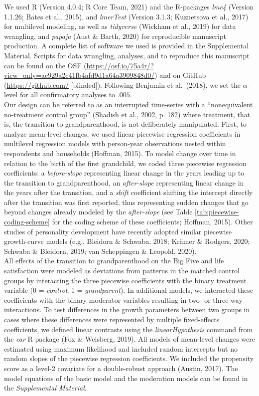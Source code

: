 \documentclass[
  english,
  man, noextraspace]{apa7}
\begin{document}
We used R (Version 4.0.4; R Core Team, 2021) and the R-packages \emph{lme4} (Version 1.1.26; Bates et al., 2015), and \emph{lmerTest} (Version 3.1.3; Kuznetsova et al., 2017) for multilevel modeling, as well as \emph{tidyverse} (Wickham et al., 2019) for data wrangling, and \emph{papaja} (Aust \& Barth, 2020) for reproducible manuscript production. A complete list of software we used is provided in the Supplemental Material. Scripts for data wrangling, analyses, and to reproduce this manuscript can be found on the OSF (\url{https://osf.io/75a4r/?view_only=ac929a2c41fb4afd9d1a64a3909848d0/}) and on GitHub (\url{https://github.com/} {[}blinded{]}). Following Benjamin et al.~(2018), we set the \(\alpha\)-level for all confirmatory analyses to \(.005\).\\
Our design can be referred to as an interrupted time-series with a \enquote{nonequivalent no-treatment control group} (Shadish et al., 2002, p. 182) where treatment, that is, the transition to grandparenthood, is not deliberately manipulated. First, to analyze mean-level changes, we used linear piecewise regression coefficients in multilevel regression models with person-year observations nested within respondents and households (Hoffman, 2015). To model change over time in relation to the birth of the first grandchild, we coded three piecewise regression coefficients: a \emph{before-slope} representing linear change in the years leading up to the transition to grandparenthood, an \emph{after-slope} representing linear change in the years after the transition, and a \emph{shift} coefficient shifting the intercept directly after the transition was first reported, thus representing sudden changes that go beyond changes already modeled by the \emph{after-slope} (see Table \ref{tab:piecewise-coding-scheme} for the coding scheme of these coefficients; Hoffman, 2015). Other studies of personality development have recently adopted similar piecewise growth-curve models (e.g., Bleidorn \& Schwaba, 2018; Krämer \& Rodgers, 2020; Schwaba \& Bleidorn, 2019; van Scheppingen \& Leopold, 2020).\\
All effects of the transition to grandparenthood on the Big Five and life satisfaction were modeled as deviations from patterns in the matched control groups by interacting the three piecewise coefficients with the binary treatment variable (0 = \emph{control}, 1 = \emph{grandparent}). In additional models, we interacted these coefficients with the binary moderator variables resulting in two- or three-way interactions. To test differences in the growth parameters between two groups in cases where these differences were represented by multiple fixed-effects coefficients, we defined linear contrasts using the \emph{linearHypothesis} command from the \emph{car} R package (Fox \& Weisberg, 2019). All models of mean-level changes were estimated using maximum likelihood and included random intercepts but no random slopes of the piecewise regression coefficients. We included the propensity score as a level-2 covariate for a double-robust approach (Austin, 2017). The model equations of the basic model and the moderation models can be found in the \emph{Supplemental Material}.\\
\end{document}
